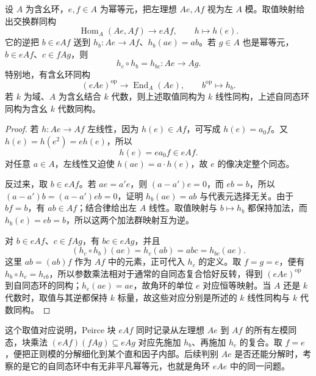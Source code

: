 \begin{proposition}\label{b2:prop:corner-endomorphism}
	设 \(A\) 为含幺环，\(e,f\in A\) 为幂等元，把左理想 \(Ae,Af\) 视为左 \(A\) 模。取值映射给出交换群同构
	\[
		\operatorname{Hom}_A(Ae,Af)\longrightarrow eAf, \qquad h\longmapsto h(e).
	\]
	它的逆把 \(b\in eAf\) 送到 \(h_b:Ae\rightarrow Af\)、\(h_b(ae)=ab\)。若 \(g\in A\) 也是幂等元，\(b\in eAf\)、\(c\in fAg\)，则
	\[
		h_c\circ h_b=h_{bc}:Ae\longrightarrow Ag.
	\]
	特别地，有含幺环同构
	\[
		(eAe)^{\mathrm{op}}\longrightarrow\operatorname{End}_A(Ae), \qquad b^{\mathrm{op}}\longmapsto h_b.
	\]
	若 \(k\) 为域、\(A\) 为含幺结合 \(k\) 代数，则上述取值同构为 \(k\) 线性同构，上述自同态环同构为含幺 \(k\) 代数同构。
\end{proposition}
\begin{proof}
	若 \(h:Ae\to Af\) 左线性，因为 \(h(e)\in Af\)，可写成 \(h(e)=a_0f\)。又 \(h(e)=h(e^2)=e h(e)\)，所以
	\[
		h(e)=ea_0f\in eAf.
	\]
	对任意 \(a\in A\)，左线性又迫使 \(h(ae)=a\cdot h(e)\)，故 \(e\) 的像决定整个同态。

	反过来，取 \(b\in eAf\)。若 \(ae=a'e\)，则 \((a-a')e=0\)，而 \(eb=b\)，所以 \((a-a')b=(a-a')eb=0\)，证明 \(h_b(ae)=ab\) 与代表元选择无关。由于 \(bf=b\)，有 \(ab\in Af\)；结合律给出左 \(A\) 线性。取值映射与 \(b\mapsto h_b\) 都保持加法，而 \(h_b(e)=eb=b\)，所以这两个加法群映射互为逆。

	对 \(b\in eAf\)、\(c\in fAg\)，有 \(bc\in eAg\)，并且
	\[
		(h_c\circ h_b)(ae)=h_c(ab)=abc=h_{bc}(ae).
	\]
	这里 \(ab=(ab)f\) 作为 \(Af\) 中的元素，正可代入 \(h_c\) 的定义。取 \(f=g=e\)，便有 \(h_b\circ h_c=h_{cb}\)，所以参数乘法相对于通常的自同态复合恰好反转，得到 \((eAe)^{\mathrm{op}}\) 到自同态环的同构；\(h_e(ae)=ae\)，故角环的单位 \(e\) 对应恒等映射。当 \(A\) 还是 \(k\) 代数时，取值与其逆都保持 \(k\) 标量，故这些对应分别是所述的 \(k\) 线性同构与 \(k\) 代数同构。
\end{proof}

这个取值对应说明，Peirce 块 \(eAf\) 同时记录从左理想 \(Ae\) 到 \(Af\) 的所有左模同态，块乘法 \((eAf)(fAg)\subseteq eAg\) 对应先施加 \(h_b\)、再施加 \(h_c\) 的复合。取 \(f=e\)，便把正则模的分解细化到某个直和因子内部。后续判别 \(Ae\) 是否还能分解时，考察的是它的自同态环中有无非平凡幂等元，也就是角环 \(eAe\) 中的同一问题。
